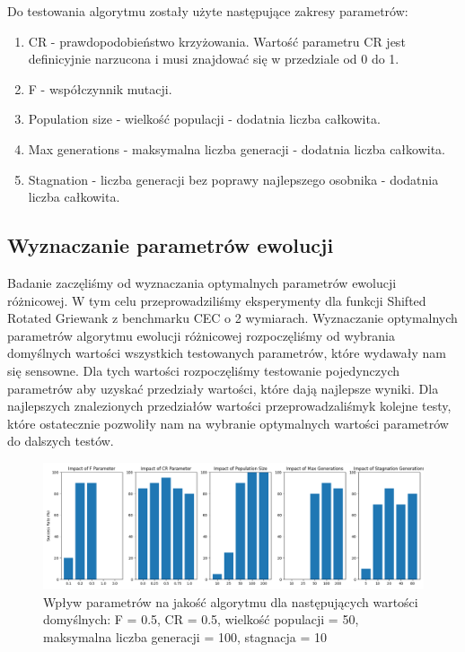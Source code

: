 \documentclass{article}
\begin{document}
Do testowania algorytmu zostały użyte następujące zakresy parametrów:

\begin{enumerate}
    \item CR - prawdopodobieństwo krzyżowania. Wartość parametru CR jest definicyjnie narzucona i musi znajdować się w przedziale od 0 do 1.
    \item F - współczynnik mutacji.
    \item Population size - wielkość populacji - dodatnia liczba całkowita.
    \item Max generations - maksymalna liczba generacji - dodatnia liczba całkowita.
    \item Stagnation - liczba generacji bez poprawy najlepszego osobnika - dodatnia liczba całkowita.
\end{enumerate}

\subsection{Wyznaczanie parametrów ewolucji}

Badanie zaczęliśmy od wyznaczania optymalnych parametrów ewolucji różnicowej. W tym celu przeprowadziliśmy eksperymenty dla funkcji Shifted Rotated Griewank z benchmarku CEC o 2 wymiarach. Wyznaczanie optymalnych parametrów algorytmu ewolucji różnicowej rozpoczęliśmy od wybrania domyślnych wartości wszystkich testowanych parametrów, które wydawały nam się sensowne. Dla tych wartości rozpoczęliśmy testowanie pojedynczych parametrów aby uzyskać przedziały wartości, które dają najlepsze wyniki. Dla najlepszych znalezionych przedziałów wartości przeprowadzaliśmyk kolejne testy, które ostatecznie pozwoliły nam na wybranie optymalnych wartości parametrów do dalszych testów. 

\begin{figure}[H]
    \centering
    \includegraphics[width=\textwidth]{parameter_tuning_results_separate1.png}
    \caption{Wpływ parametrów na jakość algorytmu dla następujących wartości domyślnych: F = 0.5, CR = 0.5, wielkość populacji = 50, maksymalna liczba generacji = 100, stagnacja = 10}
    \label{fig:parameter_results1}
\end{figure}
\end{document}
